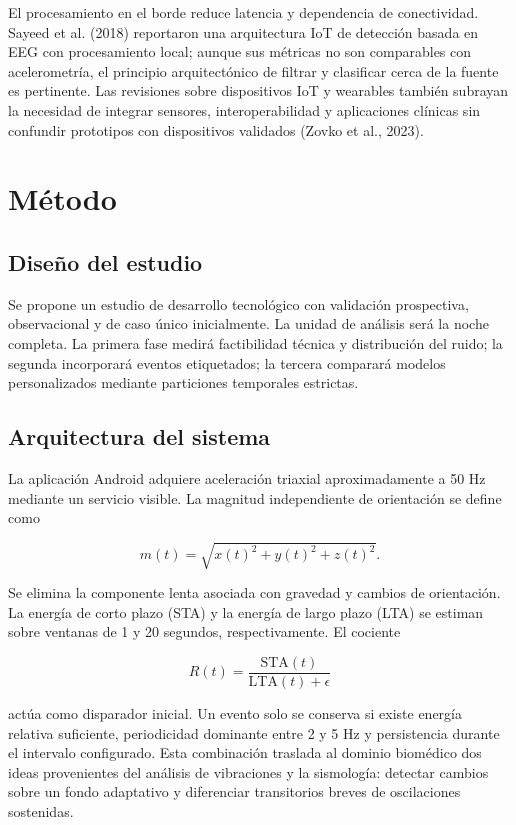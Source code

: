 \documentclass[12pt]{article}
\begin{document}
El procesamiento en el borde reduce latencia y dependencia de conectividad. Sayeed et al. (2018) reportaron una arquitectura IoT de detección basada en EEG con procesamiento local; aunque sus métricas no son comparables con acelerometría, el principio arquitectónico de filtrar y clasificar cerca de la fuente es pertinente. Las revisiones sobre dispositivos IoT y wearables también subrayan la necesidad de integrar sensores, interoperabilidad y aplicaciones clínicas sin confundir prototipos con dispositivos validados (Zovko et al., 2023).

\section{Método}

\subsection{Diseño del estudio}

Se propone un estudio de desarrollo tecnológico con validación prospectiva, observacional y de caso único inicialmente. La unidad de análisis será la noche completa. La primera fase medirá factibilidad técnica y distribución del ruido; la segunda incorporará eventos etiquetados; la tercera comparará modelos personalizados mediante particiones temporales estrictas.

\subsection{Arquitectura del sistema}

La aplicación Android adquiere aceleración triaxial aproximadamente a 50 Hz mediante un servicio visible. La magnitud independiente de orientación se define como

\begin{equation}
m(t)=\sqrt{x(t)^2+y(t)^2+z(t)^2}.
\end{equation}

Se elimina la componente lenta asociada con gravedad y cambios de orientación. La energía de corto plazo (STA) y la energía de largo plazo (LTA) se estiman sobre ventanas de 1 y 20 segundos, respectivamente. El cociente

\begin{equation}
R(t)=\frac{\mathrm{STA}(t)}{\mathrm{LTA}(t)+\epsilon}
\end{equation}

actúa como disparador inicial. Un evento solo se conserva si existe energía relativa suficiente, periodicidad dominante entre 2 y 5 Hz y persistencia durante el intervalo configurado. Esta combinación traslada al dominio biomédico dos ideas provenientes del análisis de vibraciones y la sismología: detectar cambios sobre un fondo adaptativo y diferenciar transitorios breves de oscilaciones sostenidas.
\end{document}
